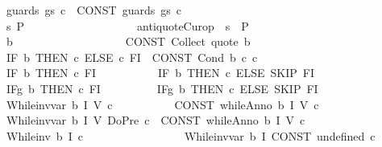 \begin{isabellebody}
\ \ {\isachardoublequoteopen}{\isacharunderscore}guards\ gs\ c{\isachardoublequoteclose}\ {\isacharequal}{\isacharequal}\ {\isachardoublequoteopen}CONST\ guards\ gs\ c{\isachardoublequoteclose}\isanewline
\isanewline
\ \ {\isachardoublequoteopen}{\isacharbraceleft}{\isacharbar}s{\isachardot}\ P{\isacharbar}{\isacharbraceright}{\isachardoublequoteclose}\ \ \ \ \ \ \ \ \ \ \ \ \ \ \ \ \ \ \ {\isacharequal}{\isacharequal}\ {\isachardoublequoteopen}{\isacharbraceleft}{\isacharbar}{\isacharunderscore}antiquoteCur{\isacharparenleft}op\ {\isacharequal}\ s{\isacharparenright}\ {\isasymand}\ P\ {\isacharbar}{\isacharbraceright}{\isachardoublequoteclose}\isanewline
\ \ {\isachardoublequoteopen}{\isacharbraceleft}{\isacharbar}b{\isacharbar}{\isacharbraceright}{\isachardoublequoteclose}\ \ \ \ \ \ \ \ \ \ \ \ \ \ \ \ \ \ \ {\isacharequal}{\isachargreater}\ {\isachardoublequoteopen}CONST\ Collect\ {\isacharparenleft}{\isacharunderscore}quote\ b{\isacharparenright}{\isachardoublequoteclose}\isanewline
\ \ {\isachardoublequoteopen}IF\ b\ THEN\ c{}\ ELSE\ c{}\ FI{\isachardoublequoteclose}\ {\isacharequal}{\isachargreater}\ {\isachardoublequoteopen}CONST\ Cond\ {\isacharbraceleft}{\isacharbar}b{\isacharbar}{\isacharbraceright}\ c{}\ c{}{\isachardoublequoteclose}\isanewline
\ \ {\isachardoublequoteopen}IF\ b\ THEN\ c{}\ FI{\isachardoublequoteclose}\ \ \ \ \ \ \ \ \ {\isacharequal}{\isacharequal}\ \ {\isachardoublequoteopen}IF\ b\ THEN\ c{}\ ELSE\ SKIP\ FI{\isachardoublequoteclose}\isanewline
\ \ {\isachardoublequoteopen}IF\isactrlsub g\ b\ THEN\ c{}\ FI{\isachardoublequoteclose}\ \ \ \ \ \ \ \ {\isacharequal}{\isacharequal}\ \ {\isachardoublequoteopen}IF\isactrlsub g\ b\ THEN\ c{}\ ELSE\ SKIP\ FI{\isachardoublequoteclose}\isanewline
\isanewline
\ \ {\isachardoublequoteopen}{\isacharunderscore}While{\isacharunderscore}inv{\isacharunderscore}var\ b\ I\ V\ c{\isachardoublequoteclose}\ \ \ \ \ \ \ \ \ \ {\isacharequal}{\isachargreater}\ {\isachardoublequoteopen}CONST\ whileAnno\ {\isacharbraceleft}{\isacharbar}b{\isacharbar}{\isacharbraceright}\ I\ V\ c{\isachardoublequoteclose}\isanewline
\ \ {\isachardoublequoteopen}{\isacharunderscore}While{\isacharunderscore}inv{\isacharunderscore}var\ b\ I\ V\ {\isacharparenleft}{\isacharunderscore}DoPre\ c{\isacharparenright}{\isachardoublequoteclose}\ {\isacharless}{\isacharequal}\ {\isachardoublequoteopen}CONST\ whileAnno\ {\isacharbraceleft}{\isacharbar}b{\isacharbar}{\isacharbraceright}\ I\ V\ c{\isachardoublequoteclose}\isanewline
\ \ {\isachardoublequoteopen}{\isacharunderscore}While{\isacharunderscore}inv\ b\ I\ c{\isachardoublequoteclose}\ \ \ \ \ \ \ \ \ \ \ \ \ \ \ \ \ {\isacharequal}{\isacharequal}\ {\isachardoublequoteopen}{\isacharunderscore}While{\isacharunderscore}inv{\isacharunderscore}var\ b\ I\ {\isacharparenleft}CONST\ undefined{\isacharparenright}\ c{\isachardoublequoteclose}\isanewline

\end{isabellebody}
